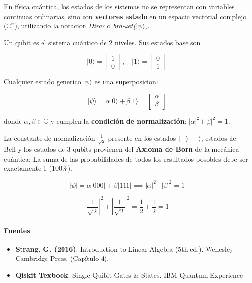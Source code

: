 \documentclass[11pt]{article}
\providecommand{\tightlist}{%
      \setlength{\itemsep}{0pt}\setlength{\parskip}{0pt}}
\begin{document}
En física cuántica, los estados de los sistemas no se representan con
variables continuas ordinarias, sino con \textbf{vectores estado} en un
espacio vectorial complejo (\(\mathbb{C}^n\)), utilizando la notacion
\emph{Dirac} o \emph{bra-ket(\(\vert\psi\rangle\))}.

Un qubit es el sistema cuántico de 2 niveles. Sus estados base son

\[\vert{0}\rangle = \begin{bmatrix} 1 \\ 0 \end{bmatrix}, \quad \vert{1}\rangle = \begin{bmatrix} 0 \\ 1 \end{bmatrix}\]

Cualquier estado generico \(\vert\psi\rangle\) es una superposicion:

\[\vert\psi\rangle = \alpha \vert{0}\rangle + \beta \vert{1}\rangle = \begin{bmatrix} \alpha \\ \beta \end{bmatrix}\]

donde \(\alpha, \beta \in \mathbb{C}\) y cumplen la \textbf{condición de
normalización}: \(\vert\alpha\vert^2 + \vert\beta\vert^2 = 1\).

La constante de normalización \(\frac{1}{\sqrt{2}}\) presente en los
estados \(\vert{+}\rangle,\vert{-}\rangle\), estados de Bell y los
estados de 3 qubits provienen del \textbf{Axioma de Born} de la mecánica
cuántica: La suma de las probabilidades de todos los resultados posobles
debe ser exactamente 1 (100\%).

\[\vert{\psi}\vert = \alpha\vert{000}\vert + \beta\vert{111}\vert \implies \vert{\alpha}\vert^2 + \vert{\beta}\vert^2 = 1\]

\[\left\vert\frac{1}{\sqrt{2}}\right\vert^2 + \left\vert\frac{1}{\sqrt{2}}\right\vert^2 = \frac{1}{2} + \frac{1}{2} = 1\]

\paragraph{Fuentes}\label{fuentes}

\begin{itemize}
\tightlist
\item
  \textbf{Strang, G. (2016)}. Introduction to Linear Algebra (5th ed.).
  Wellesley-Cambridge Press. (Capítulo 4).
\item
  \textbf{Qiskit Texbook}: Single Quibit Gates \& States. IBM Quantum
  Experience
\end{itemize}
\end{document}
